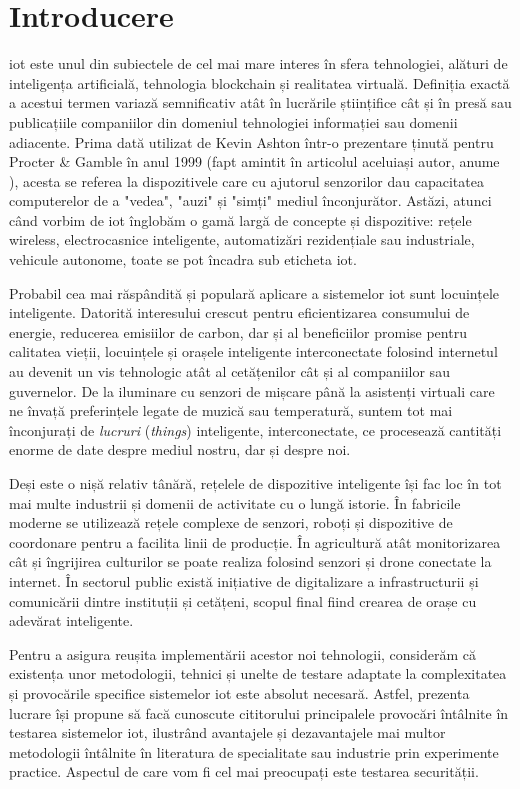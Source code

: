 \chapter{Introducere}

\acrlong{iot} este unul din subiectele de cel mai mare interes în sfera tehnologiei,
alături de inteligența artificială, tehnologia blockchain și realitatea virtuală. 
Definiția exactă a acestui termen variază semnificativ atât în lucrările
științifice cât și în presă sau publicațiile companiilor din domeniul tehnologiei informației sau domenii adiacente. Prima dată utilizat de Kevin Ashton într-o prezentare ținută pentru Procter \& Gamble în anul 1999 (fapt amintit în articolul aceluiași autor, anume ), acesta se referea la dispozitivele care cu ajutorul senzorilor dau capacitatea computerelor de a "vedea", "auzi" și "simți" mediul înconjurător. Astăzi, atunci când vorbim de \acrshort{iot} înglobăm o gamă largă de concepte și dispozitive: rețele wireless, electrocasnice inteligente, automatizări rezidențiale sau industriale, vehicule autonome, toate se pot încadra sub eticheta \acrshort{iot}.

Probabil cea mai răspândită și populară aplicare a sistemelor \acrshort{iot} sunt locuințele inteligente. Datorită interesului crescut pentru eficientizarea consumului de energie, reducerea emisiilor de carbon, dar și al beneficiilor promise pentru calitatea vieții, locuințele și orașele inteligente interconectate folosind internetul au devenit un vis tehnologic atât al cetățenilor cât și al companiilor sau guvernelor. De la iluminare cu senzori de mișcare până la asistenți virtuali care ne învață preferințele legate de muzică sau temperatură, suntem tot mai înconjurați de \textit{lucruri} (\textit{things}) inteligente, interconectate, ce procesează cantități enorme de date despre mediul nostru, dar și despre noi. 

Deși este o nișă relativ tânără, rețelele de dispozitive inteligente își fac loc în tot mai multe industrii și domenii de activitate cu o lungă istorie. În fabricile moderne se utilizează rețele complexe de senzori, roboți și dispozitive de coordonare pentru a facilita linii de producție. În agricultură atât monitorizarea cât și îngrijirea culturilor se poate realiza folosind senzori și drone conectate la internet. În sectorul public există inițiative de digitalizare a infrastructurii și comunicării dintre instituții și cetățeni, scopul final fiind crearea de orașe cu adevărat inteligente. 

Pentru a asigura reușita implementării acestor noi tehnologii, considerăm că existența unor metodologii, tehnici și unelte de testare adaptate la complexitatea și provocările specifice sistemelor \acrshort{iot} este absolut necesară. Astfel, prezenta lucrare își propune să facă cunoscute cititorului principalele provocări întâlnite în testarea sistemelor \acrshort{iot}, ilustrând avantajele și dezavantajele mai multor metodologii întâlnite în literatura de specialitate sau industrie prin experimente practice. Aspectul de care vom fi cel mai preocupați este testarea securității.

